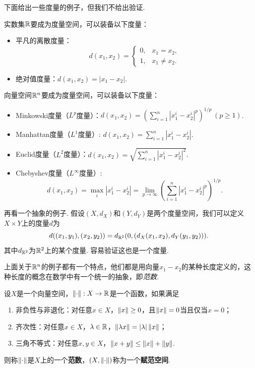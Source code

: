 下面给出一些度量的例子，但我们不给出验证. 
\begin{example}\label{example:metric}
    实数集$\mathbb{R}$要成为度量空间，可以装备以下度量：
    \begin{itemize}
            \item 平凡的离散度量：
            \[d(x_1,x_2)=\begin{cases}0,&x_1=x_2,\\1,&x_1\neq x_2.\end{cases}\]
            \item 绝对值度量：$d(x_1,x_2)=|x_1-x_2|$. 
        \end{itemize}

        向量空间$\mathbb{R}^n$要成为度量空间，可以装备以下度量：
        \begin{itemize}
            \item Minkowski度量（$L^p$度量）：$d(x_1,x_2)=(\sum_{i=1}^n|x_1^i-x_2^i|^p)^{1/p}\ (p\geq 1)$. 
            \item Manhattan度量（$L^1$度量）: $d(x_1,x_2)=\sum_{i=1}^n|x_1^i-x_2^i|$. 
            \item Euclid度量（$L^2$度量）：$d(x_1,x_2)=\sqrt{\sum_{i=1}^n|x_1^i-x_2^i|^2}$. 
            \item Chebyshev度量（$L^\infty$度量）: 
            \[d(x_1,x_2)=\max_i|x_1^i-x_2^i|=\lim_{p\to\infty}\left(\sum_{i=1}^n|x_1^i-x_2^i|^p\right)^{1/p}.\] 
        \end{itemize}

    再看一个抽象的例子. 假设$(X,d_X)$和$(Y,d_Y)$是两个度量空间，我们可以定义$X\times Y$上的度量$d$为
    \[d((x_1,y_1),(x_2,y_2))=d_{\mathbb{R}^2}(0,(d_X(x_1,x_2),d_Y(y_1,y_2))).\]
    其中$d_{\mathbb{R}^2}$为$\mathbb{R}^2$上的某个度量. 容易验证这也是一个度量. 
\end{example}

上面关于$\mathbb{R}^n$的例子都有一个特点，他们都是用向量$x_1-x_2$的某种长度定义的，这种长度的概念在数学中有一个统一的抽象，即\textit{范数}. 

\begin{definition}[范数，赋范空间]
设$X$是一个向量空间，$\left\|\cdot\right\|:X\to\mathbb{R}$是一个函数，如果满足
\begin{enumerate}
    \item 非负性与非退化：对任意$x\in X$，$\left\|x\right\|\geq 0$，且$\left\|x\right\|=0$当且仅当$x=0$；
    \item 齐次性：对任意$x\in X$，$\lambda\in\mathbb{R}$，$\left\|\lambda x\right\|=|\lambda|\left\|x\right\|$；
    \item 三角不等式：对任意$x,y\in X$，$\left\|x+y\right\|\leq \left\|x\right\|+\left\|y\right\|$. 
\end{enumerate}
则称$\left\|\cdot\right\|$是$X$上的一个\textbf{范数}，$(X,\left\|\cdot\right\|)$称为一个\textbf{赋范空间}. 
\end{definition}

